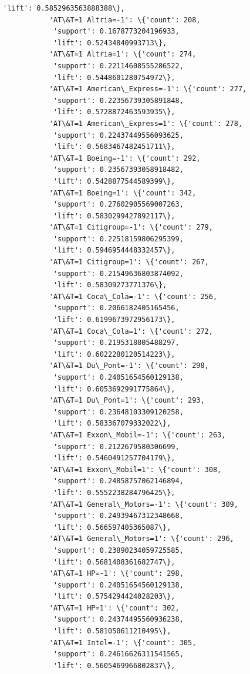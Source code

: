 \documentclass[11pt]{article}
\begin{document}
\begin{Verbatim}[commandchars=\\\{\}]
            'lift': 0.5852963563888388\},
           'AT\&T=1 Altria=-1': \{'count': 208,
            'support': 0.1678773204196933,
            'lift': 0.52434840993713\},
           'AT\&T=1 Altria=1': \{'count': 274,
            'support': 0.22114608555286522,
            'lift': 0.5448601280754972\},
           'AT\&T=1 American\_Express=-1': \{'count': 277,
            'support': 0.22356739305891848,
            'lift': 0.5728872463593935\},
           'AT\&T=1 American\_Express=1': \{'count': 278,
            'support': 0.22437449556093625,
            'lift': 0.5683467482451711\},
           'AT\&T=1 Boeing=-1': \{'count': 292,
            'support': 0.23567393058918482,
            'lift': 0.5428877544589399\},
           'AT\&T=1 Boeing=1': \{'count': 342,
            'support': 0.27602905569007263,
            'lift': 0.5830299427892117\},
           'AT\&T=1 Citigroup=-1': \{'count': 279,
            'support': 0.22518159806295399,
            'lift': 0.5946954448332457\},
           'AT\&T=1 Citigroup=1': \{'count': 267,
            'support': 0.21549636803874092,
            'lift': 0.58309273771376\},
           'AT\&T=1 Coca\_Cola=-1': \{'count': 256,
            'support': 0.2066182405165456,
            'lift': 0.6199673972956173\},
           'AT\&T=1 Coca\_Cola=1': \{'count': 272,
            'support': 0.2195318805488297,
            'lift': 0.6022280120514223\},
           'AT\&T=1 Du\_Pont=-1': \{'count': 298,
            'support': 0.24051654560129138,
            'lift': 0.6053692991775864\},
           'AT\&T=1 Du\_Pont=1': \{'count': 293,
            'support': 0.23648103309120258,
            'lift': 0.583367079332022\},
           'AT\&T=1 Exxon\_Mobil=-1': \{'count': 263,
            'support': 0.2122679580306699,
            'lift': 0.5460491257704179\},
           'AT\&T=1 Exxon\_Mobil=1': \{'count': 308,
            'support': 0.24858757062146894,
            'lift': 0.5552238284796425\},
           'AT\&T=1 General\_Motors=-1': \{'count': 309,
            'support': 0.24939467312348668,
            'lift': 0.566597405365087\},
           'AT\&T=1 General\_Motors=1': \{'count': 296,
            'support': 0.23890234059725585,
            'lift': 0.5681408361682747\},
           'AT\&T=1 HP=-1': \{'count': 298,
            'support': 0.24051654560129138,
            'lift': 0.5754294424028203\},
           'AT\&T=1 HP=1': \{'count': 302,
            'support': 0.24374495560936238,
            'lift': 0.581050611210495\},
           'AT\&T=1 Intel=-1': \{'count': 305,
            'support': 0.24616626311541565,
            'lift': 0.5605469966802837\},

\end{Verbatim}
\end{document}
